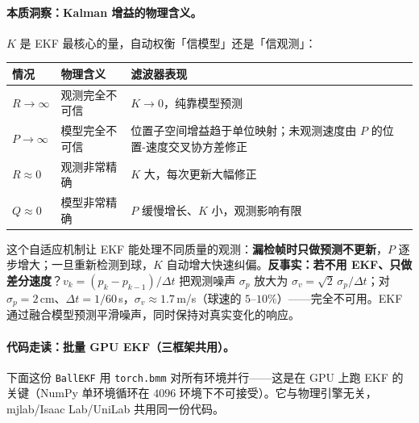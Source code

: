 \paragraph{本质洞察：Kalman 增益的物理含义。}$K$ 是 EKF 最核心的量，自动权衡「信模型」还是「信观测」：

\begin{center}
\small
\begin{tabular}{@{}lll@{}}
\toprule
情况 & 物理含义 & 滤波器表现 \\
\midrule
$R\to\infty$ & 观测完全不可信 & $K\to 0$，纯靠模型预测 \\
$P\to\infty$ & 模型完全不可信 & 位置子空间增益趋于单位映射；未观测速度由 $P$ 的位置-速度交叉协方差修正 \\
$R\approx 0$ & 观测非常精确 & $K$ 大，每次更新大幅修正 \\
$Q\approx 0$ & 模型非常精确 & $P$ 缓慢增长、$K$ 小，观测影响有限 \\
\bottomrule
\end{tabular}
\end{center}

这个自适应机制让 EKF 能处理不同质量的观测：\textbf{漏检帧时只做预测不更新}，$P$ 逐步增大；一旦重新检测到球，$K$ 自动增大快速纠偏。\textbf{反事实：若不用 EKF、只做差分速度}？$v_k=(p_k-p_{k-1})/\Delta t$ 把观测噪声 $\sigma_p$ 放大为 $\sigma_v=\sqrt2\,\sigma_p/\Delta t$；对 $\sigma_p=2$\,cm、$\Delta t=1/60$\,s，$\sigma_v\approx 1.7$\,m/s（球速的 $5$--$10\%$）——完全不可用。EKF 通过融合模型预测平滑噪声，同时保持对真实变化的响应。

\paragraph{代码走读：批量 GPU EKF（三框架共用）。}下面这份 \verb|BallEKF| 用 \verb|torch.bmm| 对所有环境并行——这是在 GPU 上跑 EKF 的关键（NumPy 单环境循环在 $4096$ 环境下不可接受）。它与物理引擎无关，mjlab/Isaac Lab/UniLab 共用同一份代码。

